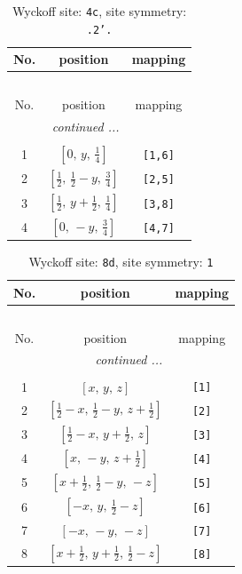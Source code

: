 \documentclass[fleqn,8pt]{jsarticle}
\begin{document}
\renewcommand{\arraystretch}{1.2}
\begin{longtable}{ccc}
\caption{Wyckoff site: {\tt 4c}, site symmetry: {\tt .2'.}}
 \\
 \hline \hline
No. & position & mapping \\ \hline \endfirsthead

\multicolumn{2}{l}{\tablename\ \thetable{}} \\
 \hline \hline
No. & position & mapping \\ \hline \endhead

 \hline \hline
\multicolumn{2}{r}{\footnotesize\it continued ...} \\ \endfoot

 \hline \hline
\multicolumn{2}{r}{} \\ \endlastfoot

1 & $\left[ 0,\, y,\, \frac{1}{4} \right]$ & {\tt [1,6]} \\ \hline
2 & $\left[ \frac{1}{2},\, \frac{1}{2} - y,\, \frac{3}{4} \right]$ & {\tt [2,5]} \\ \hline
3 & $\left[ \frac{1}{2},\, y + \frac{1}{2},\, \frac{1}{4} \right]$ & {\tt [3,8]} \\ \hline
4 & $\left[ 0,\, - y,\, \frac{3}{4} \right]$ & {\tt [4,7]} \\
\end{longtable}
\renewcommand{\arraystretch}{1.2}
\begin{longtable}{ccc}
\caption{Wyckoff site: {\tt 8d}, site symmetry: {\tt 1}}
 \\
 \hline \hline
No. & position & mapping \\ \hline \endfirsthead

\multicolumn{2}{l}{\tablename\ \thetable{}} \\
 \hline \hline
No. & position & mapping \\ \hline \endhead

 \hline \hline
\multicolumn{2}{r}{\footnotesize\it continued ...} \\ \endfoot

 \hline \hline
\multicolumn{2}{r}{} \\ \endlastfoot

1 & $\left[ x,\, y,\, z \right]$ & {\tt [1]} \\ \hline
2 & $\left[ \frac{1}{2} - x,\, \frac{1}{2} - y,\, z + \frac{1}{2} \right]$ & {\tt [2]} \\ \hline
3 & $\left[ \frac{1}{2} - x,\, y + \frac{1}{2},\, z \right]$ & {\tt [3]} \\ \hline
4 & $\left[ x,\, - y,\, z + \frac{1}{2} \right]$ & {\tt [4]} \\ \hline
5 & $\left[ x + \frac{1}{2},\, \frac{1}{2} - y,\, - z \right]$ & {\tt [5]} \\ \hline
6 & $\left[ - x,\, y,\, \frac{1}{2} - z \right]$ & {\tt [6]} \\ \hline
7 & $\left[ - x,\, - y,\, - z \right]$ & {\tt [7]} \\ \hline
8 & $\left[ x + \frac{1}{2},\, y + \frac{1}{2},\, \frac{1}{2} - z \right]$ & {\tt [8]} \\
\end{longtable}
\end{document}
